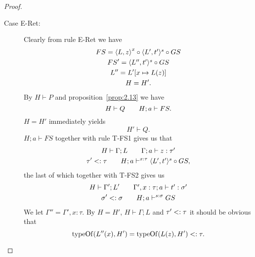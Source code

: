 \begin{proof}
\begin{description}
\begin{description}
        \item[Case {\sc E-Ret}:] Clearly from rule {\sc E-Ret} we have
          \begin{equation}
            \begin{gathered}
              FS = \mbox{$\langle L, z \rangle$}^x \circ \mbox{$\langle L', t' \rangle^s$} \circ GS \\
              FS' = \mbox{$\langle L'', t' \rangle^s$} \circ GS \\
              L'' = L'[x \mapsto L(z)] \\
              H = H'.
            \end{gathered}
          \end{equation}
          By $H \vdash P$ and proposition~\ref{prop:2.13} we have
          \begin{equation} \label{eq:eret-hp0}
            H \vdash Q \quad\quad H; a \vdash FS.
          \end{equation}
          $H = H'$ immediately yields
          \begin{equation}
            H' \vdash Q.
          \end{equation}
          $H; a \vdash FS$ together with rule {\sc T-FS1} gives us that
          \begin{equation}
            \begin{gathered}
              H \vdash \Gamma; L \quad\quad \mbox{$\Gamma;a\vdash z:\tau'$} \\
              \tau' <: \tau \quad\quad H; a \vdash^{x: \tau} \mbox{$\langle L', t' \rangle^s$} \circ GS,
            \end{gathered}
          \end{equation}
          the last of which together with {\sc T-FS2} gives us
          \begin{equation} \label{eq:eret-hp1}
            \begin{gathered}
              H \vdash \Gamma'; L' \quad\quad \mbox{$\Gamma', x:
              \tau;a\vdash t':\sigma'$} \\
              \sigma' <: \sigma \quad\quad H; a \vdash^{s: \sigma} GS
            \end{gathered}
          \end{equation}
          We let $\Gamma'' = \Gamma', x : \tau$. By $H = H'$, $H \vdash \Gamma;
          L$ and $\tau' <: \tau$ it should be obvious that
          \begin{equation} \label{eq:eret-hp3}
            \mbox{$\mathrm{typeOf}$}(L''(x), H') = \mbox{$\mathrm{typeOf}$}(L(z), H') <: \tau.
          \end{equation}

\end{description}
\end{description}
\end{proof}
